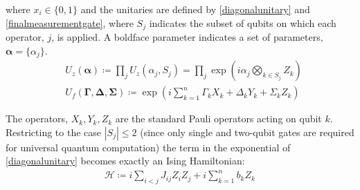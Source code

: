 \noindent where $x_i \in \{0, 1\}$ and the unitaries are defined by \eqref{diagonalunitary} and \eqref{finalmeasurementgate}, where $S_j$ indicates the subset of qubits on which each operator, $j$, is applied. A boldface parameter indicates a set of parameters, $\boldsymbol\alpha = \{\alpha_j\}$.
\begin{align}
  &U_z(\boldsymbol\alpha) \coloneqq  \prod_j U_z \left( \alpha_j, S_j \right) = \prod_j\exp \left( i \alpha_j \bigotimes_{k \in S_j} Z_k \right)\label{diagonalunitary}\\
    &U_f \left( \mathbf{\Gamma}, \mathbf{\Delta}, \mathbf{\Sigma} \right) \coloneqq \exp\left(i\sum\limits_{k=1}^n \Gamma_k X_k + \Delta_k Y_k +\Sigma_k Z_k\right)    \label{finalmeasurementgate}
\end{align}

\noindent The operators, $X_k, Y_k, Z_k$ are the standard Pauli operators acting on qubit $k$.
Restricting to the case $|S_j| \leq 2$ (since only single and two-qubit gates are required for universal quantum computation) the term in the exponential of \eqref{diagonalunitary} becomes exactly an Ising Hamiltonian:
\begin{align}
 \mathcal{H} \coloneqq i\sum\limits_{i<j} J_{ij}Z_iZ_j + i\sum\limits_{k=1}^n b_k Z_k \label{iqp_ising_hamiltonian}
 \end{align}



